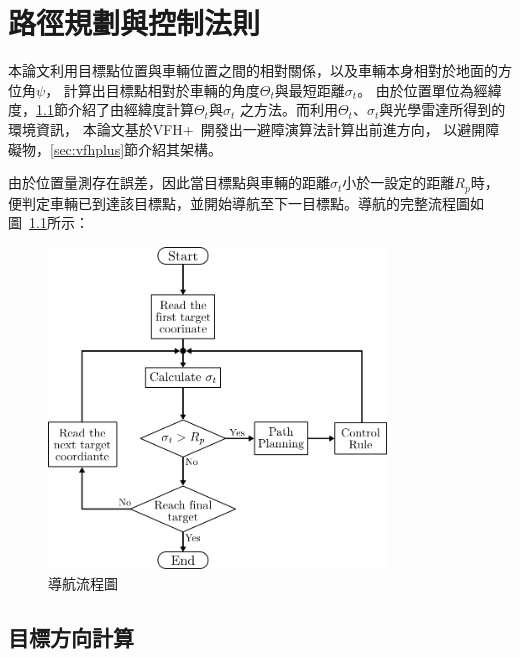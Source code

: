 \chapter{路徑規劃與控制法則}
\label{c:obstacle_avoidance}

本論文利用目標點位置與車輛位置之間的相對關係，以及車輛本身相對於地面的方位角$\psi$，
計算出目標點相對於車輛的角度$\Theta_t$與最短距離$\sigma_t$。
由於位置單位為經緯度，\ref{sec:target}節介紹了由經緯度計算$\Theta_t$與$\sigma_t$
之方法。而利用$\Theta_t$、$\sigma_t$與光學雷達所得到的環境資訊，
本論文基於VFH+~\cite{Ulrich:1998:VFHPlus}開發出一避障演算法計算出前進方向，
以避開障礙物，\ref{sec:vfhplus}節介紹其架構。

由於位置量測存在誤差，因此當目標點與車輛的距離$\sigma_t$小於一設定的距離$R_p$時，
便判定車輛已到達該目標點，並開始導航至下一目標點。導航的完整流程圖如圖~\ref{f:navigation_flow}所示：
\begin{figure}[h!]
	\centering
	\includegraphics[width=0.8\textwidth]{figures/navigation_flow}
	\caption{導航流程圖}
	\label{f:navigation_flow}
\end{figure}

\section{目標方向計算}
\label{sec:target}

